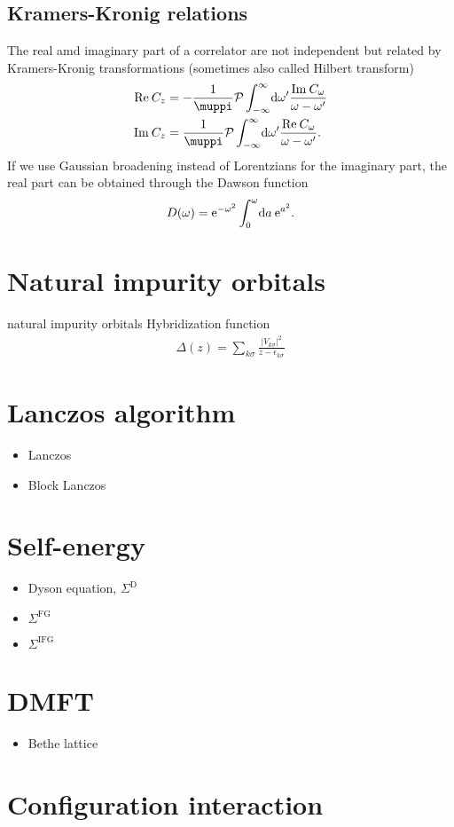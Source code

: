 \subsection{Kramers-Kronig relations}

The real amd imaginary part of a correlator are not independent
but related by Kramers-Kronig transformations (sometimes also called Hilbert transform)
\begin{subequations}
    \begin{align}
        \Re C_z
         & =
        -\frac{1}{\muppi} \mathcal{P} \int_{-\infty}^\infty\! \md\omega' \frac{\Im C_\omega}{\omega - \omega'} \\
        \Im C_z
         & =
        \frac{1}{\muppi} \mathcal{P} \int_{-\infty}^\infty\! \md\omega' \frac{\Re C_\omega}{\omega - \omega'}.
    \end{align}
\end{subequations}
If we use Gaussian broadening instead of Lorentzians for the imaginary part,
the real part can be obtained through the Dawson function
\begin{equation}
    D(\omega) = \mathrm{e}^{-\omega^2}\int_0^\omega\! \mathrm{d} a\> \mathrm{e}^{a^2}.
\end{equation}

\section{Natural impurity orbitals}

natural impurity orbitals
Hybridization function
\begin{align}
    \Delta(z) = \sum_{k\sigma} \frac{|V_{k\sigma}|^2}{z - \epsilon_{k\sigma}}
\end{align}

\section{Lanczos algorithm}

\begin{itemize}
    \item Lanczos
    \item Block Lanczos
\end{itemize}

\section{Self-energy}

\begin{itemize}
    \item Dyson equation, $\Sigma^\mathrm{D}$
    \item $\Sigma^\mathrm{FG}$
    \item $\Sigma^\mathrm{IFG}$
\end{itemize}

\section{DMFT}

\begin{itemize}
    \item Bethe lattice
\end{itemize}

\section{Configuration interaction}
